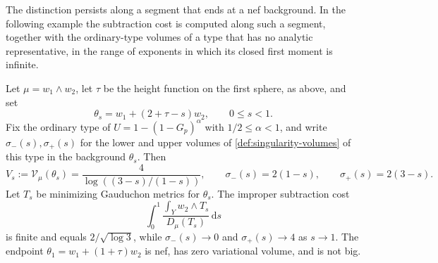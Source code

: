 The distinction persists along a segment that ends at a nef background. In the following example the subtraction cost is computed along such a segment, together with the ordinary-type volumes of a type that has no analytic representative, in the range of exponents in which its closed first moment is infinite.

\begin{example}\label{ex:ruled-logarithmic-nef-endpoint}
Let $\mu=w_1\wedge w_2$, let
$\tau$ be the height function on the first sphere, as above, and set
\[
 \theta_s=w_1+(2+\tau-s)w_2,\qquad 0\leq s<1.
\]
Fix the ordinary type of $U=1-(1-G_p)^\alpha$ with $1/2\leq\alpha<1$, and write $\sigma_-(s),\sigma_+(s)$ for the lower and upper volumes of \cref{def:singularity-volumes} of this type in the background $\theta_s$. Then
\begin{equation}\label{eq:ruled-logarithmic-moving-volumes}
 V_s:=\mathcal V_\mu(\theta_s)=\frac4{\log((3-s)/(1-s))},\qquad
 \sigma_-(s)=2(1-s),\qquad \sigma_+(s)=2(3-s).
\end{equation}
Let $T_s$ be minimizing Gauduchon metrics for $\theta_s$. The improper subtraction cost
\[
 \int_0^1\frac{\int_Yw_2\wedge T_s}{D_\mu(T_s)}\,\mathrm ds
\]
is finite and equals $2/\sqrt{\log3}$, while $\sigma_-(s)\to0$ and $\sigma_+(s)\to4$ as $s\to1$. The endpoint $\theta_1=w_1+(1+\tau)w_2$ is nef, has zero variational volume, and is not big.
\end{example}
